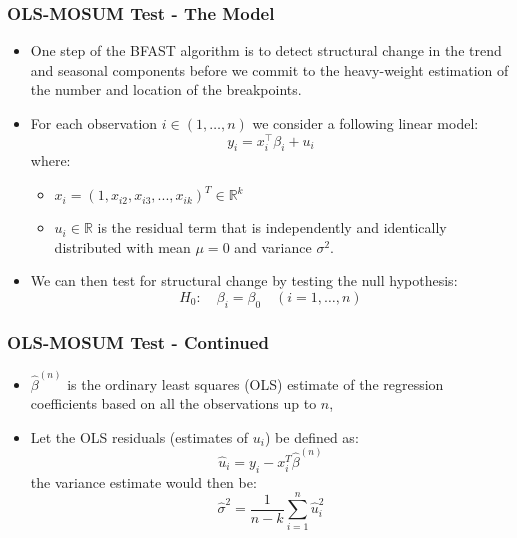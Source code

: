 \documentclass[presentation.tex]{subfiles}
\begin{document}
\begin{frame}
\frametitle{OLS-MOSUM Test - The Model}
\begin{itemize}
  \item One step of the BFAST algorithm is to detect structural change in the
    trend and seasonal components before we commit to the heavy-weight
    estimation of the number and location of the breakpoints.
  \item For each observation $i \in (1, \ldots, n)$ we consider a following linear model:
    \[
    y_{i}=x_{i}^{\top} \beta_{i}+u_{i}
    \]
    where:
    \begin{itemize}
    \item $x_i = (1,x_{i2}, x_{i3}, ..., x_{ik})^T \in \mathbb{R}^k$
    \item $u_i \in \mathbb{R}$ is the residual term that is independently and identically
      distributed with mean $\mu = 0$ and variance $\sigma^2$.
    \end{itemize}
  \item 
    We can then test for structural change by testing the null hypothesis:
    \[
    H_0:\quad \beta_i = \beta_0 \quad(i=1, \ldots, n)
    \]
\end{itemize}
\end{frame}

\begin{frame}
  \frametitle{OLS-MOSUM Test - Continued}
  \begin{itemize}
  \item $\hat{\beta}^{(n)}$ is the ordinary least squares (OLS) estimate of the
    regression coefficients based on all the observations up to $n$,
  \item 
    Let the OLS residuals (estimates of $u_i$) be defined as:
    \begin{equation} \label{eq:residuals}
      \hat{u}_i = y_i - x_i^T\hat{\beta}^{(n)}
    \end{equation}
    the variance estimate would then be:
    \begin{equation} \label{eq:sigma}
      \hat{\sigma}^{2}=\frac{1}{n-k} \sum_{i=1}^{n} \hat{u}_{i}^{2}
    \end{equation}
  \end{itemize} 
\end{frame}
\end{document}
